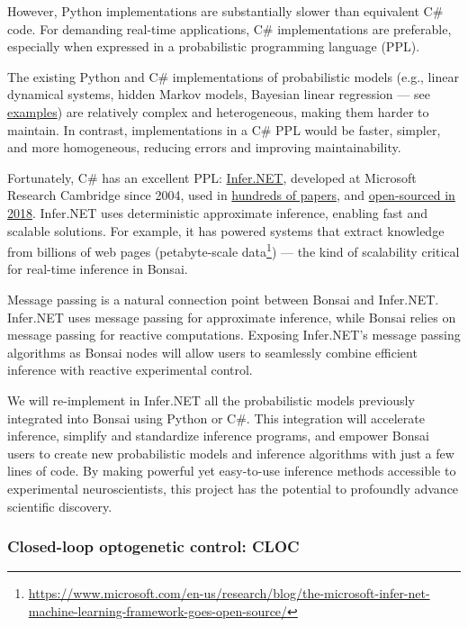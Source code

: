 However, Python implementations are substantially slower than equivalent C\#
code. For demanding real-time applications, C\# implementations are preferable,
especially when expressed in a probabilistic programming language (PPL).

The existing Python and C\# implementations of probabilistic models (e.g.,
linear dynamical systems, hidden Markov models, Bayesian linear regression —
see
\href{https://bonsai-rx.org/machinelearning/examples/README.html}{examples})
are relatively complex and heterogeneous, making them harder to maintain. In
contrast, implementations in a C\# PPL would be faster, simpler, and more
homogeneous, reducing errors and improving maintainability.

Fortunately, C\# has an excellent PPL:
\href{https://dotnet.github.io/infer/}{Infer.NET}, developed at Microsoft
Research Cambridge since 2004, used in
\href{https://dotnet.github.io/infer/papers.html}{hundreds of papers}, and
\href{https://www.microsoft.com/en-us/research/blog/the-microsoft-infer-net-machine-learning-framework-goes-open-source/}{open-sourced
in 2018}.  Infer.NET uses deterministic approximate inference, enabling fast
and scalable solutions. For example, it has powered systems that extract
knowledge from billions of web pages (petabyte-scale
data\footnote[7]{\url{https://www.microsoft.com/en-us/research/blog/the-microsoft-infer-net-machine-learning-framework-goes-open-source/}})
— the kind of scalability critical for real-time inference in Bonsai.

Message passing is a natural connection point between Bonsai and Infer.NET.
Infer.NET uses message passing for approximate inference, while Bonsai relies
on message passing for reactive computations. Exposing Infer.NET’s message
passing algorithms as Bonsai nodes will allow users to seamlessly combine
efficient inference with reactive experimental control.

We will re-implement in Infer.NET all the probabilistic models previously
integrated into Bonsai using Python or C\#. This integration will accelerate
inference, simplify and standardize inference programs, and empower Bonsai
users to create new probabilistic models and inference algorithms with just a
few lines of code. By making powerful yet easy-to-use inference methods
accessible to experimental neuroscientists, this project has the potential to
profoundly advance scientific discovery.

\subsubsection*{Closed-loop optogenetic control: CLOC}

